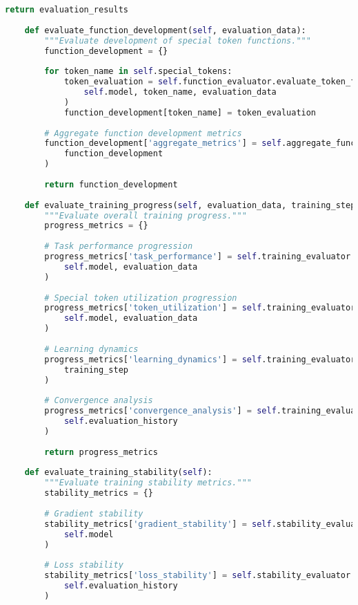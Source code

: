 \begin{lstlisting}[language=Python, caption=Comprehensive evaluation metrics framework for special token training]
        return evaluation_results
    
    def evaluate_function_development(self, evaluation_data):
        """Evaluate development of special token functions."""
        function_development = {}
        
        for token_name in self.special_tokens:
            token_evaluation = self.function_evaluator.evaluate_token_function(
                self.model, token_name, evaluation_data
            )
            function_development[token_name] = token_evaluation
        
        # Aggregate function development metrics
        function_development['aggregate_metrics'] = self.aggregate_function_metrics(
            function_development
        )
        
        return function_development
    
    def evaluate_training_progress(self, evaluation_data, training_step):
        """Evaluate overall training progress."""
        progress_metrics = {}
        
        # Task performance progression
        progress_metrics['task_performance'] = self.training_evaluator.evaluate_task_performance(
            self.model, evaluation_data
        )
        
        # Special token utilization progression
        progress_metrics['token_utilization'] = self.training_evaluator.evaluate_token_utilization(
            self.model, evaluation_data
        )
        
        # Learning dynamics
        progress_metrics['learning_dynamics'] = self.training_evaluator.evaluate_learning_dynamics(
            training_step
        )
        
        # Convergence analysis
        progress_metrics['convergence_analysis'] = self.training_evaluator.analyze_convergence(
            self.evaluation_history
        )
        
        return progress_metrics
    
    def evaluate_training_stability(self):
        """Evaluate training stability metrics."""
        stability_metrics = {}
        
        # Gradient stability
        stability_metrics['gradient_stability'] = self.stability_evaluator.evaluate_gradient_stability(
            self.model
        )
        
        # Loss stability
        stability_metrics['loss_stability'] = self.stability_evaluator.evaluate_loss_stability(
            self.evaluation_history
        )
        

\end{lstlisting}
